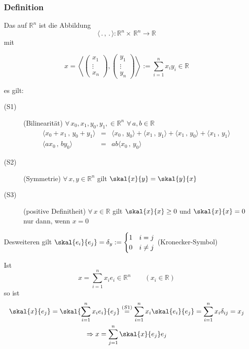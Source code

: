\subsubsection[Das Skalarprodukt]{Definition} %
\label{ssub:definition}

Das  auf $\mathbb{R}^n$ ist die Abbildung \[ \langle\, .\,,\,.\,\rangle : \mathbb{R}^n \times \, \mathbb{R}^n \to \mathbb{R}\] mit 

\[
 x = \left< \begin{pmatrix} x_1 \\ \vdots \\ x_n \end{pmatrix} , \begin{pmatrix} y_1 \\ \vdots \\ y_n \end{pmatrix} \right> := \sum_{i=1}^{n}x_iy_i \in \mathbb{R} 
 \]
 
es gilt:
\begin{description}
	\item[(S1)] (Bilinearität) $\forall \, x_0,x_1,y_0,y_1, \in \mathbb{R}^n \hspace{4pt} \forall \, a,b \in \mathbb{R}$
	 \begin{eqnarray}
	 \langle x_0+x_1\,,\, y_0+y_1\rangle & =& \langle x_0\,,\, y_0\rangle + \langle x_1\,,\,y_1\rangle + \langle x_1\,,\, y_0\rangle + \langle x_1\,,\, y_1\rangle \\
	 \langle ax_0\,,\, by_0\rangle &=& ab \langle x_0\,,\, y_0\rangle 
	 \end{eqnarray}
	 \item[(S2)](Symmetrie) $\forall \, x,y \in \mathbb{R}^n$ gilt $\skal{x}{y} = \skal{y}{x}$
	
	\item[(S3)](positive Definitheit) $\forall \, x \in \mathbb{R}$ gilt $\skal{x}{x} \geq 0$ und $\skal{x}{x}=0$ nur dann, wenn $x=0$
\end{description}
Desweiteren gilt $\skal{e_i}{e_j}=\delta_y := \begin{cases} 1 & i=j \\ 0 &i\neq j \end{cases}$ \hspace{1cm} (Kronecker-Symbol)

Ist \[
	x=\sum_{i=1}^{n}x_ie_i \in \mathbb{R}^n \qquad (x_i \in \mathbb{R})
	\]
so ist \begin{gather*}
	\skal{x}{e_j} = \skal{\sum_{i=1}^{n}x_ie_i}{e_j} \stackrel{(S1)}{=} \sum_{i=1}^{n}x_i \skal{e_i}{e_j} = \sum^{n}_{i=1}x_i \delta_{ij} = x_j \\
	\Rightarrow x = \sum^{n}_{j=1} \skal{x}{e_j}e_j
\end{gather*}

